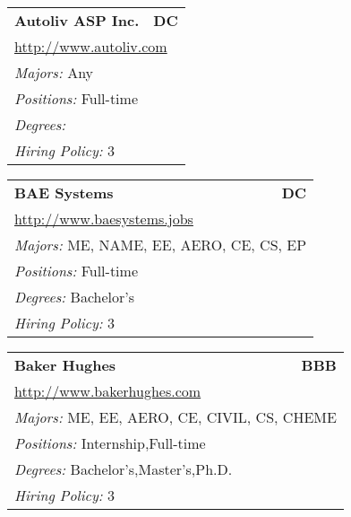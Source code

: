 \documentclass[twoside]{article}
\begin{document}
\begin{center}
\begin{multicols}{3}
\begin{FlushLeft}
\begin{minipage}{.9\columnwidth}
\end{minipage}
 
\begin{minipage}{.9\columnwidth}\begin{tabularx}{.95\columnwidth}{Xr}
                 {\Large\bf Autoliv ASP Inc.} & {\Large\bf DC}\\
    \multicolumn{2}{p{.95\columnwidth}}{\url{http://www.autoliv.com}}\\
    \multicolumn{2}{p{.95\columnwidth}}{\emph{Majors:} Any}\\
    \multicolumn{2}{p{.95\columnwidth}}{\emph{Positions:} Full-time}\\
    \multicolumn{2}{p{.95\columnwidth}}{\emph{Degrees:} }\\
    \multicolumn{2}{p{.95\columnwidth}}{\emph{Hiring Policy:} 3}\\
    \end{tabularx}
    
\end{minipage}
 
\begin{minipage}{.9\columnwidth}\begin{tabularx}{.95\columnwidth}{Xr}
                 {\Large\bf BAE Systems} & {\Large\bf DC}\\
    \multicolumn{2}{p{.95\columnwidth}}{\url{http://www.baesystems.jobs}}\\
    \multicolumn{2}{p{.95\columnwidth}}{\emph{Majors:} ME, NAME, EE, AERO, CE, CS, EP}\\
    \multicolumn{2}{p{.95\columnwidth}}{\emph{Positions:} Full-time}\\
    \multicolumn{2}{p{.95\columnwidth}}{\emph{Degrees:} Bachelor's}\\
    \multicolumn{2}{p{.95\columnwidth}}{\emph{Hiring Policy:} 3}\\
    \end{tabularx}
    
\end{minipage}
 
\begin{minipage}{.9\columnwidth}\begin{tabularx}{.95\columnwidth}{Xr}
                 {\Large\bf Baker Hughes} & {\Large\bf BBB}\\
    \multicolumn{2}{p{.95\columnwidth}}{\url{http://www.bakerhughes.com}}\\
    \multicolumn{2}{p{.95\columnwidth}}{\emph{Majors:} ME, EE, AERO, CE, CIVIL, CS, CHEME}\\
    \multicolumn{2}{p{.95\columnwidth}}{\emph{Positions:} Internship,Full-time}\\
    \multicolumn{2}{p{.95\columnwidth}}{\emph{Degrees:} Bachelor's,Master's,Ph.D.}\\
    \multicolumn{2}{p{.95\columnwidth}}{\emph{Hiring Policy:} 3}\\
    \end{tabularx}
    

\end{minipage}
\end{FlushLeft}
\end{multicols}
\end{center}
\end{document}
